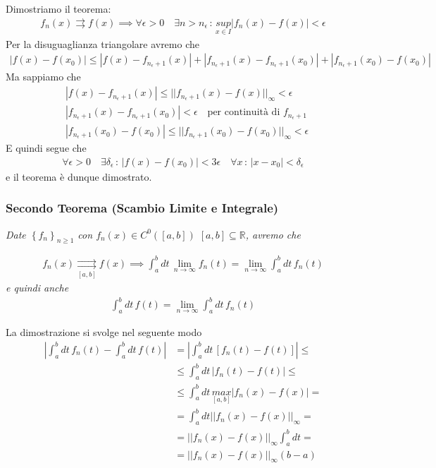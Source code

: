 \bigskip

Dimostriamo il teorema:
\begin{align}
f_n(x) \rightrightarrows f(x) \implies \forall \epsilon >0 \quad \exists n>n_\epsilon \, : \, \underset{x\in I}{sup}| f_n(x) - f(x)|<\epsilon 
\end{align}
Per la disuguaglianza triangolare avremo che
\begin{align}
|f(x)-f(x_0)| \leq |f(x) - f_{n_\epsilon + 1}(x)|+|f_{n_\epsilon + 1}(x)- f_{n_\epsilon + 1}(x_0)|+|f_{n_\epsilon + 1}(x_0) - f(x_0)|
\end{align}
Ma sappiamo che
\begin{align}
{}& |f(x) - f_{n_\epsilon + 1}(x)|\leq||f_{n_\epsilon + 1}(x) - f(x)||_\infty <\epsilon \\
& |f_{n_\epsilon + 1}(x)- f_{n_\epsilon + 1}(x_0)|<\epsilon \quad \text{per continuità di }f_{n_\epsilon + 1} \\
& |f_{n_\epsilon + 1}(x_0) - f(x_0)| \leq||f_{n_\epsilon + 1}(x_0) - f(x_0)||_\infty <\epsilon 
\end{align}
E quindi segue che
\begin{align}
\forall \epsilon>0  \quad \exists \delta_\epsilon \, : \, |f(x)-f(x_0)| < 3\epsilon \quad \forall x \, : \, |x-x_0|<\delta_\epsilon
\end{align}
e il teorema è dunque dimostrato.

\subsubsection{Secondo Teorema (Scambio Limite e Integrale)}
\textit{
Date $\left\{f_n \right\}_{n\geq 1}$ con $f_n(x)\in C^0([a,b])$ $[a,b]\subseteq \mathbb{R}$, avremo che}

\begin{align}
f_n(x)\underset{[a,b]}{\rightrightarrows} f(x) \implies \int_{a}^{b} dt \, \underset{n\rightarrow \infty}{\lim}f_n(t)= \underset{n\rightarrow \infty}{\lim} \int_{a}^{b} dt \, f_n(t) 
\end{align}
\textit{e quindi anche}
\begin{align}
\int_{a}^{b} dt \, f(t)= \underset{n\rightarrow \infty}{\lim} \int_{a}^{b} dt \, f_n(t)
\end{align}

La dimostrazione si svolge nel seguente modo
\begin{align}
\left|\int_{a}^{b} dt \, f_n(t) - \int_{a}^{b} dt \, f(t)\right| {}&= \left|\int_{a}^{b} dt \, [f_n(t) -  f(t)]\right| \leq \nonumber \\
&\leq \int_{a}^{b} dt \, |f_n(t) -  f(t)| \leq \nonumber \\
&\leq \int_{a}^{b} dt \, \underset{[a,b]}{max}|f_n(x) -  f(x)| = \nonumber \\
&= \int_{a}^{b} dt ||f_n(x) -  f(x)||_\infty = \nonumber \\
&= ||f_n(x) -  f(x)||_\infty \int_{a}^{b} dt = \nonumber \\
&=||f_n(x) -  f(x)||_\infty (b-a)
\end{align} 


